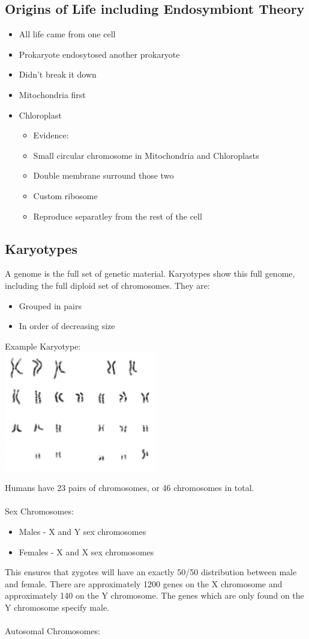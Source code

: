 \documentclass{article}
\begin{document}
\subsection{Origins of Life including Endosymbiont Theory}
\begin{itemize}
\item All life came from one cell
\item Prokaryote endosytosed another prokaryote
\item Didn't break it down
\item Mitochondria first
\item Chloroplast
\begin{itemize}
\item Evidence:
\item Small circular chromosome in Mitochondria and Chloroplasts
\item Double membrane surround those two
\item Custom ribosome
\item Reproduce separatley from the rest of the cell
\end{itemize}
\end{itemize}

\subsection{Karyotypes}

A genome is the full set of genetic material. Karyotypes show this full genome, including the full diploid set of
chromosomes. They are:
\begin{itemize}
\item Grouped in pairs
\item In order of decreasing size
\end{itemize}

Example Karyotype:\\
\includegraphics[width=0.5\textwidth]{karyotype}

Humans have 23 pairs of chromosomes, or 46 chromosomes in total.
\\
\\
Sex Chromosomes:
\begin{itemize}
\item Males - X and Y sex chromosomes
\item Females - X and X sex chromosomes
\end{itemize}
This ensures that zygotes will have an exactly 50/50 distribution between male and female. There are approximately
1200 genes on the X chromosome and approximately 140 on the Y chromosome. The genes which are only found on the Y
chromosome specify male.
\\
\\
Autosomal Chromosomes:
\end{document}
